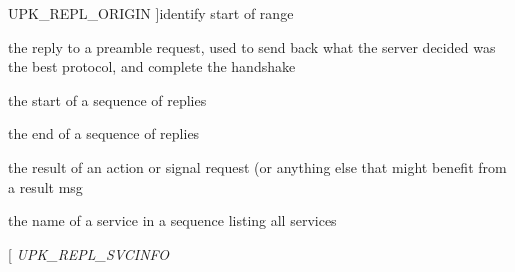 \begin{Desc}
\begin{description}
{UPK\_\-REPL\_\-ORIGIN\label{controller_2tp_8c_gab04f5fc5314f6296f0ef4b171d1b4282add29cfc837c5ebedb09f56117e74c163}
}]identify start of range \item[{\em 
UPK\_\-REPL\_\-PREAMBLE\label{controller_2tp_8c_gab04f5fc5314f6296f0ef4b171d1b4282a96215c5d056e77a04493e423dc22c6b4}
}]the reply to a preamble request, used to send back what the server decided was the best protocol, and complete the handshake \item[{\em 
UPK\_\-REPL\_\-SEQ\_\-START\label{controller_2tp_8c_gab04f5fc5314f6296f0ef4b171d1b4282af5f2208106bd9e4b85b58abf0c91016d}
}]the start of a sequence of replies \item[{\em 
UPK\_\-REPL\_\-SEQ\_\-END\label{controller_2tp_8c_gab04f5fc5314f6296f0ef4b171d1b4282a08f5de1191d69da4a59758eeef26bac2}
}]the end of a sequence of replies \item[{\em 
UPK\_\-REPL\_\-RESULT\label{controller_2tp_8c_gab04f5fc5314f6296f0ef4b171d1b4282a553cb105e6ff4b627e2799cfc3f8f74c}
}]the result of an action or signal request (or anything else that might benefit from a result msg \item[{\em 
UPK\_\-REPL\_\-LISTING\label{controller_2tp_8c_gab04f5fc5314f6296f0ef4b171d1b4282ac158a8306626930b47ef905a7830e07f}
}]the name of a service in a sequence listing all services \item[{\em 
UPK\_\-REPL\_\-SVCINFO\label{controller_2tp_8c_gab04f5fc5314f6296f0ef4b171d1b4282ae1add19bc555a5ce4badb159f98e0e37}
}
\end{description}
\end{Desc}
